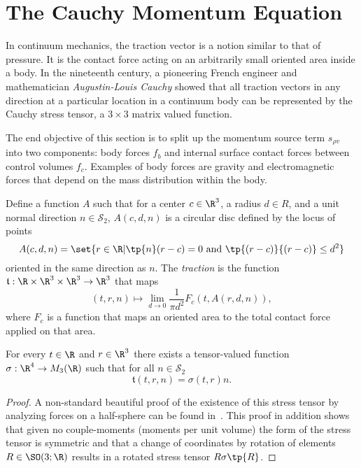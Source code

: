 \section{The Cauchy Momentum Equation}

\begin{rk}
In continuum mechanics, the traction vector is a notion
similar to that of pressure.  It is the contact force acting on an arbitrarily
small oriented area inside a body.  In the nineteenth century, a pioneering French engineer
and mathematician \emph{Augustin-Louis Cauchy} showed that all traction vectors in
any direction at a particular location in a continuum body can be represented by the
Cauchy stress tensor, a $3\times 3$ matrix valued function.
\end{rk}

\begin{rk}
The end objective of this section is to split up the momentum source term $s_{\rho v}$
into two components: body forces $f_b$ and internal surface contact forces
between control volumes $f_c$.  Examples of body forces are gravity and
electromagnetic forces that depend on the mass distribution within the body.
\end{rk}

\begin{df}[Traction]
Define a function $A$ such that for a center $c\in \R^3$, a
radius $d\in R$, and a unit normal direction $n\in \mathcal{S}_2$, $A(c,d,n)$
is a circular disc defined by the locus of points
\begin{equation}
    A(c,d,n) = \set{ r\in \R | \tp{n}(r-c)=0 \text{ and } \tp{(r-c)}{(r-c)}\le d^2 }
\end{equation}
oriented in the same direction as $n$.
    The \emph{traction} is the function $\mathfrak{t}:\R\times\R^3\times \R^3\to \R^3$ that maps
    \begin{equation}
        (t,r,n) \mapsto \lim_{d\to 0} \frac{1}{\pi d^2} F_c(t,A(r,d,n)),
    \end{equation}
    where $F_c$ is a function that maps an oriented area to the total contact force
    applied on that area.
\end{df}

\begin{thm}
For every $t\in \R$ and $r\in \R^3$ there exists a
tensor-valued function $\sigma: \R^4\to M_3(\R)$ such that
for all $n\in \mathcal{S}_2$ 
    \begin{equation}
        \mathfrak{t}(t,r,n) = \sigma(t,r) n.
    \end{equation}
\end{thm}
\begin{proof}
A non-standard beautiful proof of the existence of this stress tensor
by analyzing forces on a half-sphere can be found in~\cite{silhavy}.
This proof in addition shows that given no couple-moments (moments per unit volume)
the form of the stress tensor is symmetric and that a change of coordinates by 
rotation of elements $R\in \SO(3;\R)$ results in a rotated stress tensor $R\sigma \tp{R}$.
\end{proof}

